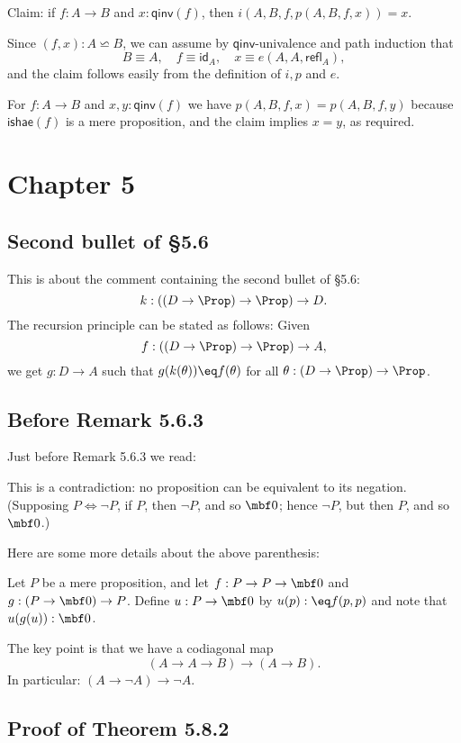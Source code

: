 \documentclass[12pt]{article}
\begin{document}
Claim: if $f:A\to B$ and $x:\mathsf{qinv}(f)$, then $i(A,B,f,p(A,B,f,x))=x$.
 
Since $(f,x):A\backsimeq B$, we can assume by $\mathsf{qinv}$-univalence and path induction that 
$$
B\equiv A,\quad f\equiv\mathsf{id}_A,\quad x\equiv e(A,A,\mathsf{refl}_A),
$$ 
and the claim follows easily from the definition of $i,p$ and $e$.

For $f:A\to B$ and $x,y:\mathsf{qinv}(f)$ we have $p(A,B,f,x)=p(A,B,f,y)$ because $\mathsf{ishae}(f)$ is a mere proposition, and the claim implies $x=y$, as required. 


\section{Chapter 5}

\subsection{Second bullet of \S5.6}%

This is about the comment containing the second bullet of \S5.6:
$$
k:((D\to\Prop)\to\Prop)\to D.
$$ 
The recursion principle can be stated as follows: Given 
$$
f:((D\to\Prop)\to\Prop)\to A,
$$ 
we get $g:D\to A$ such that $g(k(\theta))\eq f(\theta)$ for all $\theta:(D\to\Prop)\to\Prop$.


\subsection{Before Remark 5.6.3}%

Just before Remark 5.6.3 we read:

\nn\guillemotleft This is a contradiction: no proposition can be equivalent to its negation. (Supposing $P\Leftrightarrow\neg P$, if $P$, then $\neg P$, and so $\mbf0$; hence $\neg P$, but then $P$, and so $\mbf0$.)\guillemotright

Here are some more details about the above parenthesis:

Let $P$ be a mere proposition, and let $f:P\to P\to\mbf0$ and $g:(P\to\mbf0)\to P$. Define $u:P\to\mbf0$ by $u(p):\eq f(p,p)$ and note that $u(g(u)):\mbf0$.

The key point is that we have a codiagonal map
$$
(A\to A\to B)\to(A\to B).
$$ 
In particular: $(A\to\neg A)\to\neg A$.


\subsection{Proof of Theorem 5.8.2}\label{582}
\end{document}
